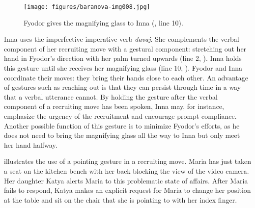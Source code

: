 \documentclass[output=paper,modfonts,nonflat]{langsci/langscibook}
\begin{document}
\begin{figure}
\caption{Fyodor gives the magnifying glass to Inna (, line 10).}
\label{fig:baranova:8}
\texttt{[image: figures/baranova-img008.jpg]}
\end{figure}

Inna uses the imperfective imperative verb \textit{davaj}. She complements the verbal component of her recruiting move with a gestural component: stretching out her hand in Fyodor's direction with her palm turned upwards (line 2, ). Inna holds this gesture until she receives her magnifying glass (line 10, ). Fyodor and Inna coordinate their moves: they bring their hands close to each other. An advantage of gestures such as reaching out is that they can persist through time in a way that a verbal utterance cannot. By holding the gesture after the verbal component of a recruiting move has been spoken, Inna may, for instance, emphasize the urgency of the recruitment and encourage prompt compliance. Another possible function of this gesture is to minimize Fyodor’s efforts, as he does not need to bring the magnifying glass all the way to Inna but only meet her hand halfway.

 illustrates the use of a pointing gesture in a recruiting move. Maria has just taken a seat on the kitchen bench with her back blocking the view of the video camera. Her daughter Katya alerts Maria to this problematic state of affairs. After Maria fails to respond, Katya makes an explicit request for Maria to change her position at the table and sit on the chair that she is pointing to with her index finger.
\end{document}

